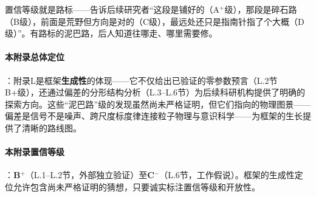 置信等级就是路标——告诉后续研究者``这段是铺好的（A$^+$级），那段是碎石路（B级），前面是荒野但方向是对的（C级），最远处还只是指南针指了个大概（D级）''。有路标的泥巴路，后人知道往哪走、哪里需要修。

\paragraph{本附录总体定位}：附录L是框架\textbf{生成性}的体现——它不仅给出已验证的零参数预言（L.2节B+级），还通过偏差的分形结构分析（L.3--L.6节）为后续科研机构提供了明确的探索方向。这些``泥巴路''级的发现虽然尚未严格证明，但它们指向的物理图景——偏差是信号不是噪声、跨尺度标度律连接粒子物理与意识科学——为框架的生长提供了清晰的路线图。

\paragraph{本附录置信等级}：\textbf{B$^+$}（L.1--L.2节，外部独立验证）至\textbf{C$^-$}（L.6节，工作假说）。框架的生成性定位允许包含尚未严格证明的猜想，只要诚实标注置信等级和开放性。
